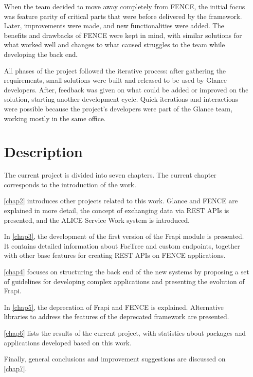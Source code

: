 When the team decided to move away completely from FENCE, the initial focus was feature parity of critical parts that were before delivered by the framework. Later, improvements were made, and new functionalities were added. The benefits and drawbacks of FENCE were kept in mind, with similar solutions for what worked well and changes to what caused struggles to the team while developing the back end.

All phases of the project followed the iterative process: after gathering the requirements, small solutions were built and released to be used by Glance developers. After, feedback was given on what could be added or improved on the solution, starting another development cycle. Quick iterations and interactions were possible because the project’s developers were part of the Glance team, working mostly in the same office. 

\section{Description}

The current project is divided into seven chapters. The current chapter corresponds to the introduction of the work.

\autoref{chap2} introduces other projects related to this work. Glance and FENCE are explained in more detail, the concept of exchanging data via REST APIs is presented, and the ALICE Service Work system is introduced.

In \autoref{chap3}, the development of the first version of the Frapi module is presented. It contains detailed information about FacTree and custom endpoints, together with other base features for creating REST APIs on FENCE applications.

\autoref{chap4} focuses on structuring the back end of the new systems by proposing a set of guidelines for developing complex applications and presenting the evolution of Frapi.

In \autoref{chap5}, the deprecation of Frapi and FENCE is explained. Alternative libraries to address the features of the deprecated framework are presented.

\autoref{chap6} lists the results of the current project, with statistics about packages and applications developed based on this work.

Finally, general conclusions and improvement suggestions are discussed on \autoref{chap7}.
